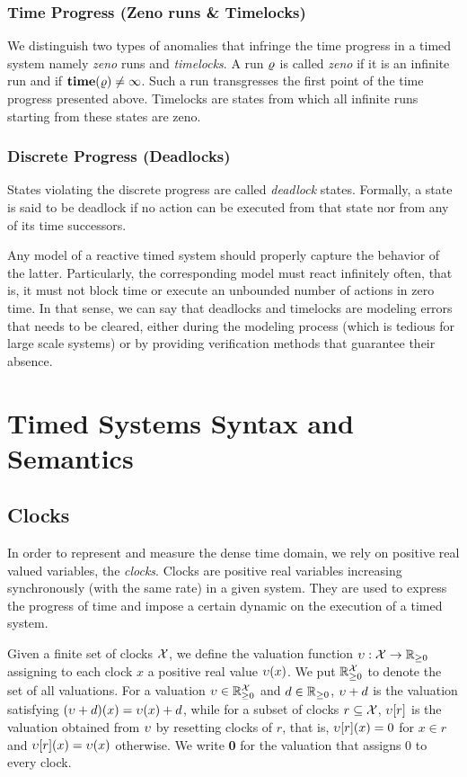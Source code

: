 \subsubsection{Time Progress (Zeno runs \& Timelocks)} 
We distinguish two types of anomalies that infringe the time progress in
a timed system namely \emph{zeno} runs and \emph{timelocks}.
A run $\varrho$ is called \emph{zeno} if it is 
an infinite run and if $\mathbf{time(\varrho)}\neq\infty$. Such a run transgresses the 
first point of the time progress presented above.
Timelocks are states from which all infinite runs starting from these states
are zeno.
\subsubsection{Discrete Progress (Deadlocks)}
States violating the discrete progress are called \emph{deadlock} states.
Formally, a state is said to be deadlock if no action can be executed from 
that state nor from any of its time successors. 

Any model of a reactive timed system should properly capture the behavior 
of the latter. Particularly, the corresponding model must react infinitely often,
that is, it must not block time or execute an unbounded number of actions in zero 
time. In that sense, we can say that deadlocks and timelocks are modeling errors
that needs to be cleared, either during the modeling process (which is tedious 
for large scale systems) or by providing verification methods that guarantee
their absence. 


\section{Timed Systems Syntax and Semantics}\label{sec:2.2}
\subsection*{Clocks}
In order to represent and measure the dense time domain, we rely on positive 
real valued variables, the \emph{clocks}. Clocks are 
positive real variables increasing synchronously (with the same rate) in a 
given system. They are used to express the progress of time and impose 
a certain dynamic on the execution of a timed system.

Given a finite set of clocks $\mathcal{X}$, we define the valuation function
$\upsilon:\mathcal{X}\to\mathbb{R}_{\ge 0}$ assigning to each clock $x$ a positive real value 
$\upsilon(x)$. We put $\mathbb{R}_{\ge 0}^{\mathcal{X}}$ to denote the set of all valuations.
For a valuation $\upsilon\in\mathbb{R}_{\ge 0}^{\mathcal{X}}$ and $d\in\mathbb{R}_{\ge 0}$, $\upsilon+d$ is the valuation
satisfying $(\upsilon+d)(x)=\upsilon(x)+d$, while for a subset of clocks 
$r\subseteq\mathcal{X}$, $\upsilon[r]$ is the valuation obtained from $\upsilon$ by 
resetting clocks of $r$, that is, $\upsilon[r](x)=0$ for $x\in r$ and
$\upsilon[r](x)=\upsilon(x)$ otherwise. We write {\bf 0} for the valuation 
that assigns 0 to every clock.

